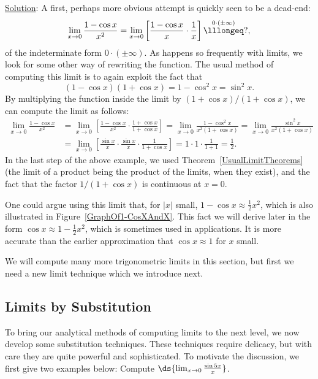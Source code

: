 \underline{Solution}: A first, perhaps more obvious attempt is quickly
seen to be a dead-end:
$$\lim_{x\to0}\frac{1-\cos x}{x^2}=
\lim_{x\to0}\left[\frac{1-\cos x}x\cdot\frac1x\right]
\overset{0\cdot(\pm\infty)}{\lllongeq}?,$$
of the indeterminate form $0\cdot(\pm\infty)$.
As happens so frequently with limits, 
we look for some other way of rewriting the function.
The usual method of computing this limit is to again exploit the fact
that 
$$(1-\cos x)(1+\cos x)=1-\cos^2x=\sin^2x.$$
By multiplying the function inside the limit by
$(1+\cos x)/(1+\cos x)$, we can compute the limit as follows:
\begin{align*}\lim_{x\to0}\frac{1-\cos x}{x^2}&
 =\lim_{x\to0}\left[\frac{1-\cos x}{x^2}
 \cdot\frac{1+\cos x}{1+\cos x}\right]=
\lim_{x\to0}\frac{1-\cos^2x}{x^2(1+\cos x)}
=\lim_{x\to0}\frac{\sin^2x}{x^2(1+\cos x)}\\
&=\lim_{x\to0}\left[\frac{\sin x}x\cdot\frac{\sin x}{x}\cdot\frac1{1+\cos x}
 \right]
=1\cdot1\cdot\frac1{1+1}=\frac12.
\end{align*}
\label{(1-CosX)XX->1/2Example}\eex
In the last step of the above example, we used 
Theorem~\ref{UsualLimitTheorems} (the limit of a product being the product
of the limits, when they exist), and the fact that the factor $1/(1+\cos x)$
is continuous at $x=0$.


One could argue using this limit that, for $|x|$ small,
$1-\cos x\approx\frac12x^2$, which is also illustrated in 
Figure~\ref{GraphOf1-CosXAndX}.  This fact
we will derive later in the form
$\cos x\approx 1-\frac12x^2$, which is sometimes used in applications.
It is more accurate than the earlier approximation that
$\cos x\approx 1$ for $x$ small.

We will compute many more trigonometric limits in this section, but
first we need a new limit technique which we introduce next.

\subsection{Limits by Substitution\label{LimitsBySubstitutionSubsection}}
To bring our analytical methods of computing limits to the next level,
we now develop some substitution techniques.
These techniques require delicacy, but with care they are quite
powerful and sophisticated.
To motivate the discussion, we first give two examples below:
\bex Compute $\ds{\lim_{x\to0}\frac{\sin5x}{x}}$.

